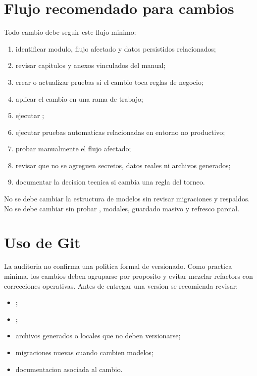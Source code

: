 \section{Flujo recomendado para cambios}
\label{sec:mantenimiento-flujo-cambios}

Todo cambio debe seguir este flujo minimo:

\begin{enumerate}
  \item identificar modulo, flujo afectado y datos persistidos relacionados;
  \item revisar capitulos y anexos vinculados del manual;
  \item crear o actualizar pruebas si el cambio toca reglas de negocio;
  \item aplicar el cambio en una rama de trabajo;
  \item ejecutar ;
  \item ejecutar pruebas automaticas relacionadas en entorno no productivo;
  \item probar manualmente el flujo afectado;
  \item revisar que no se agreguen secretos, datos reales ni archivos generados;
  \item documentar la decision tecnica si cambia una regla del torneo.
\end{enumerate}

No se debe cambiar la estructura de modelos sin revisar migraciones y respaldos. No se debe cambiar  sin probar , modales, guardado masivo y refresco parcial.

\section{Uso de Git}
\label{sec:mantenimiento-git}

La auditoria no confirma una politica formal de versionado. Como practica minima, los cambios deben agruparse por proposito y evitar mezclar refactors con correcciones operativas. Antes de entregar una version se recomienda revisar:

\begin{itemize}
  \item {};
  \item {};
  \item archivos generados o locales que no deben versionarse;
  \item migraciones nuevas cuando cambien modelos;
  \item documentacion asociada al cambio.
\end{itemize}

